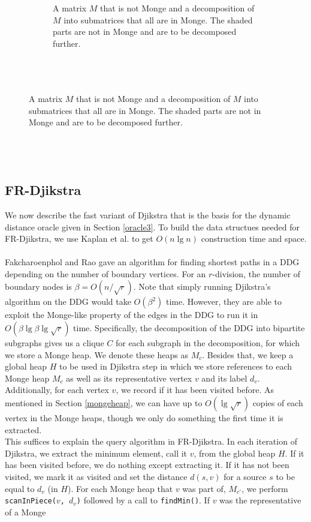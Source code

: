 \begin{figure}[h!]
\begin{subfigure}[b]{0.45\textwidth}
    \caption{A matrix $M$ that is not Monge and a decomposition of $M$ into submatrices
    that all are in Monge. The shaded parts are not in Monge and are to be decomposed
  further. \\ \\ \\ \\}
    \label{mongematrix}
  \end{subfigure}
\end{figure}

\subsection{FR-Djikstra}\label{frdjikstra}
We now describe the fast variant of Djikstra that is the basis for the dynamic distance oracle given in
Section \ref{oracle3}. To build the data structues needed for FR-Djikstra, we use Kaplan
et al. \cite{kaplan2012submatrix} to get $O(n\lg n)$ construction time and space. \\
\\
Fakcharoenphol and Rao \cite{fakcharoenphol2006planar} gave an algorithm for finding
shortest paths in a DDG depending on the number of boundary vertices. For an
$r$-division, the number of boundary nodes is $\beta=O(n/\sqrt{r})$. Note that simply
running Djikstra's algorithm on the DDG would take
$O(\beta^2)$ time. However, they are able to exploit the Monge-like property of the
edges in the DDG to run it in $O(\beta\lg \beta\lg \sqrt{r})$ time. Specifically, the
decomposition of the DDG into bipartite subgraphs gives us a
clique $C$ for each subgraph in the decomposition, for which we store a Monge heap. We
denote these heaps as $M_c$. Besides that, we keep a global heap $H$ to be used in
Djikstra step in which we store references to each Monge heap $M_c$ as well as its
representative vertex $v$ and its label $d_v$. Additionally, for each vertex $v$, we
record if it has been visited before. As mentioned in
Section \ref{mongeheap}, we can have up to $O(\lg \sqrt{r})$ copies of each vertex in the
Monge heaps, though we only do something the first time it is extracted. \\
This suffices to explain the query algorithm in FR-Djikstra. In each iteration of
Djikstra, we extract the minimum element, call it $v$, from the global heap $H$. If it has been visited
before, we do nothing except extracting it. If it has not been visited, we mark it as
visited and set the distance $d(s,v)$ for a source $s$ to be equal to $d_v$ (in $H$). For
each Monge heap that $v$ was part of, $M_{c'}$, we perform \texttt{scanInPiece($v$,
$d_v$)} followed by a call to \texttt{findMin()}. If $v$ was the representative of a Monge
